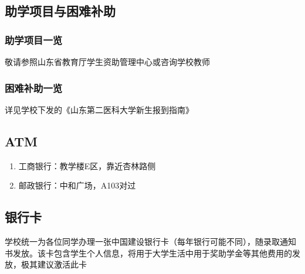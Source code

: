 \subsection[助学项目与困难补助]{助学项目与困难补助}
\subsubsection[助学项目一览]{助学项目一览}
敬请参照山东省教育厅学生资助管理中心或咨询学校教师
\subsubsection[困难补助一览]{困难补助一览}
详见学校下发的《山东第二医科大学新生报到指南》

\subsection[ATM]{ATM\footnotemark}
\begin{enumerate}
    \item 工商银行：教学楼E区，靠近杏林路侧
    \item 邮政银行：中和广场，A103对过
\end{enumerate}

\subsection[银行卡]{银行卡}
学校统一为各位同学办理一张中国建设银行卡（每年银行可能不同），随录取通知书发放。该卡包含学生个人信息，将用于大学生活中用于奖助学金等其他费用的发放，极其建议激活此卡

\textbf{}
